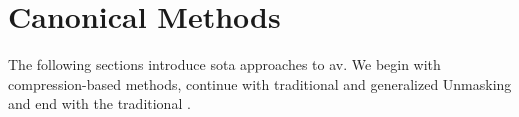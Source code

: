 \section{Canonical Methods}

The following sections introduce \ac{sota} approaches to \ac{av}.
We begin with compression-based methods, continue with traditional and generalized Unmasking and end with the traditional \impAppr{}.




  

